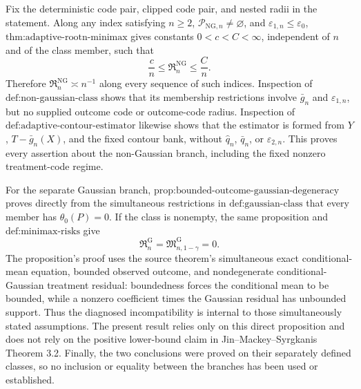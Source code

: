 Fix the deterministic code pair, clipped code pair, and nested radii in the statement.  Along any index satisfying \(n\ge2\), \(\mathcal P_{\mathrm{NG},n}\neq\varnothing\), and \(\varepsilon_{1,n}\le\varepsilon_0\), \(\text{thm:adaptive-rootn-minimax}\) gives constants \(0<c<C<\infty\), independent of \(n\) and of the class member, such that
\[
 \frac cn\le\mathfrak R_n^{\mathrm{NG}}\le\frac Cn.
\]
Therefore \(\mathfrak R_n^{\mathrm{NG}}\asymp n^{-1}\) along every sequence of such indices.  Inspection of \(\text{def:non-gaussian-class}\) shows that its membership restrictions involve \(\bar g_n\) and \(\varepsilon_{1,n}\), but no supplied outcome code or outcome-code radius.  Inspection of \(\text{def:adaptive-contour-estimator}\) likewise shows that the estimator is formed from \(Y\), \(T-\bar g_n(X)\), and the fixed contour bank, without \(\widehat q_n\), \(\bar q_n\), or \(\varepsilon_{2,n}\).  This proves every assertion about the non-Gaussian branch, including the fixed nonzero treatment-code regime.

For the separate Gaussian branch, \(\text{prop:bounded-outcome-gaussian-degeneracy}\) proves directly from the simultaneous restrictions in \(\text{def:gaussian-class}\) that every member has \(\theta_0(P)=0\).  If the class is nonempty, the same proposition and \(\text{def:minimax-risks}\) give
\[
 \mathfrak R_n^{\mathrm G}
 =\mathfrak M_{n,1-\gamma}^{\mathrm G}
 =0.
\]
The proposition's proof uses the source theorem's simultaneous exact conditional-mean equation, bounded observed outcome, and nondegenerate conditional-Gaussian treatment residual: boundedness forces the conditional mean to be bounded, while a nonzero coefficient times the Gaussian residual has unbounded support.  Thus the diagnosed incompatibility is internal to those simultaneously stated assumptions.  The present result relies only on this direct proposition and does not rely on the positive lower-bound claim in Jin--Mackey--Syrgkanis Theorem 3.2.  Finally, the two conclusions were proved on their separately defined classes, so no inclusion or equality between the branches has been used or established.